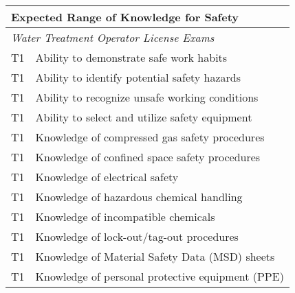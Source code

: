 \begin{table}[H]
\begin{tabular}{| m{1cm} |m{15cm} |}
\hline
\multicolumn{2}{|l|}{\textbf{Expected   Range of Knowledge for Safety}}                                                                      \\ \hline
\multicolumn{2}{|l|}{\textit{Water   Treatment Operator License Exams }}                                                                  \\ \hline
T1 & Ability to   demonstrate safe work habits                                                                                         \\ \hline
T1 & Ability to identify   potential safety hazards                                                                                    \\ \hline
T1 & Ability to recognize   unsafe working conditions                                                                                  \\ \hline
T1 & Ability to select and   utilize safety equipment                                                                                  \\ \hline
T1 & Knowledge of   compressed gas safety procedures                                                                                   \\ \hline
T1 & Knowledge of confined   space safety procedures                                                                                   \\ \hline
T1 & Knowledge of   electrical safety                                                                                                  \\ \hline
T1 & Knowledge of   hazardous chemical handling                                                                                        \\ \hline
T1 & Knowledge of   incompatible chemicals                                                                                             \\ \hline
T1 & Knowledge of   lock-out/tag-out procedures                                                                                        \\ \hline
T1 & Knowledge of Material   Safety Data (MSD) sheets                                                                                  \\ \hline
T1 & Knowledge of personal   protective equipment (PPE)                                                                                \\ \hline

\end{tabular}
\end{table}
